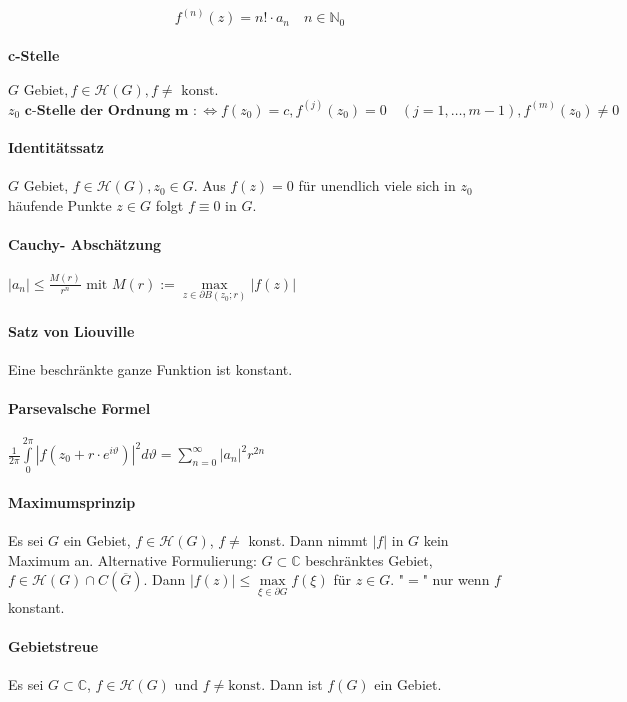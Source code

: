 \documentclass[a4paper, 10pt, DIV20, headings=small]{scrartcl}
\theoremstyle{definition}
\theoremstyle{plain}
\begin{document}
$$f^{(n)}(z) = n! \cdot a_n \quad n \in \mathbb{N}_0$$

\paragraph{c-Stelle}
$G \text{ Gebiet}, f \in \mathcal{H}(G), f \neq \text{ konst.}$
$$z_0 \textbf{ c-Stelle der Ordnung m } :\Leftrightarrow f(z_0) = c, f^{(j)}(z_0) = 0 \quad (j = 1, \ldots, m-1), f^{(m)}(z_0) \neq 0$$

\paragraph{Identitätssatz}
$G$ Gebiet, $f \in \mathcal{H}(G), z_0 \in G$.
Aus $f(z)=0$ für unendlich viele sich in $z_0$ häufende Punkte $z \in G$ folgt $f \equiv 0$ in $G$.

\paragraph{Cauchy- Abschätzung}
$|a_n| \leq \frac{M(r)}{r^n} \text{ mit } M(r) := \max\limits_{z \in \partial B(z_0;r)}{|f(z)|}$

\paragraph{Satz von Liouville}
Eine beschränkte ganze Funktion ist konstant.

\paragraph{Parsevalsche Formel}
$\frac{1}{2 \pi} \int\limits_{0}^{2 \pi}{|f(z_0 + r \cdot e^{i \vartheta})|^2 d \vartheta = \sum\limits_{n=0}^\infty |a_n|^2 r^{2n}}$

\paragraph{Maximumsprinzip}
Es sei $G$ ein Gebiet, $f \in \mathcal{H}(G)$, $f \neq$ konst. Dann nimmt $|f|$ in $G$ kein Maximum an.
Alternative Formulierung: 
$G \subset \mathbb{C}$ beschränktes Gebiet, $f \in \mathcal{H}(G) \cap C(\overline{G})$. Dann $|f(z)| \leq \max\limits_{\xi \in \partial G} f(\xi)$ für $z \in G$. "$=$" nur wenn $f$ konstant.

\paragraph{Gebietstreue}
Es sei $G \subset \mathbb{C}$, $f \in \mathcal{H}(G)$ und $f \neq \text{konst}$. Dann ist $f(G)$ ein Gebiet.
\end{document}
